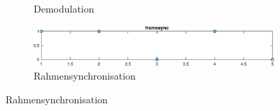 \documentclass[11pt]{article}
\begin{document}
\begin{figure}
\begin{subfigure}{\textwidth}
\caption{Demodulation}
\end{subfigure}
\begin{subfigure}{\textwidth}
\includegraphics[width=\textwidth]{framesync.eps}
\caption{Rahmensynchronisation}
\end{subfigure}
\end{figure}
\end{document}
